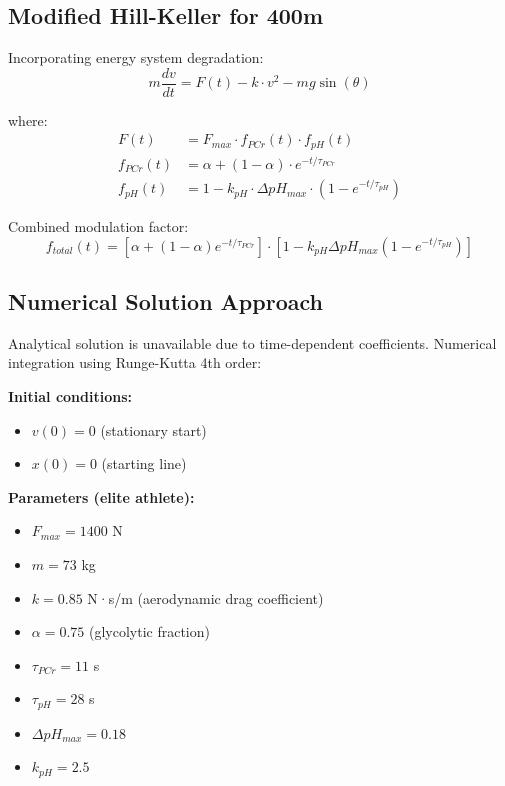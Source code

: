 \begin{figure}[htbp]
    \label{fig:muscle_coupling}
    \end{figure}



\subsection{Modified Hill-Keller for 400m}

Incorporating energy system degradation:
\begin{equation}
m \frac{dv}{dt} = F(t) - k \cdot v^2 - mg \sin(\theta)
\end{equation}

where:
\begin{align}
F(t) &= F_{max} \cdot f_{PCr}(t) \cdot f_{pH}(t) \\
f_{PCr}(t) &= \alpha + (1-\alpha) \cdot e^{-t/\tau_{PCr}} \\
f_{pH}(t) &= 1 - k_{pH} \cdot \Delta pH_{max} \cdot (1 - e^{-t/\tau_{pH}})
\end{align}

Combined modulation factor:
\begin{equation}
f_{total}(t) = \left[\alpha + (1-\alpha) e^{-t/\tau_{PCr}}\right] \cdot \left[1 - k_{pH} \Delta pH_{max}(1 - e^{-t/\tau_{pH}})\right]
\end{equation}

\subsection{Numerical Solution Approach}

Analytical solution is unavailable due to time-dependent coefficients. Numerical integration using Runge-Kutta 4th order:

\textbf{Initial conditions:}
\begin{itemize}
    \item $v(0) = 0$ (stationary start)
    \item $x(0) = 0$ (starting line)
\end{itemize}

\textbf{Parameters (elite athlete):}
\begin{itemize}
    \item $F_{max} = 1400$ N
    \item $m = 73$ kg
    \item $k = 0.85$ N·s/m (aerodynamic drag coefficient)
    \item $\alpha = 0.75$ (glycolytic fraction)
    \item $\tau_{PCr} = 11$ s
    \item $\tau_{pH} = 28$ s
    \item $\Delta pH_{max} = 0.18$
    \item $k_{pH} = 2.5$
\end{itemize}


